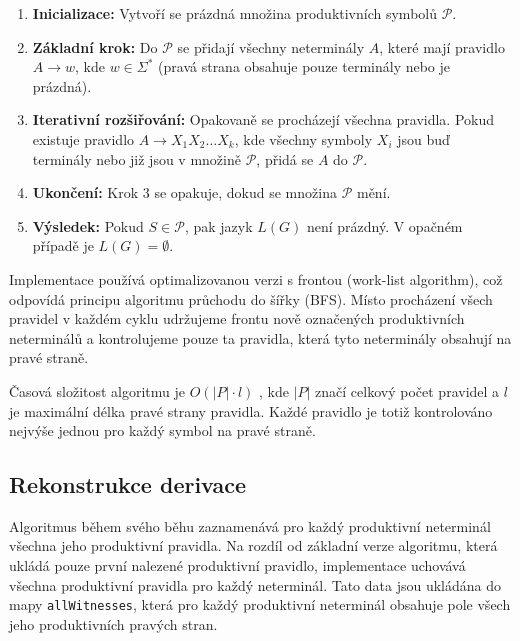 \begin{enumerate}
    \item \textbf{Inicializace:} Vytvoří se prázdná množina produktivních symbolů \( \mathcal{P} \).
    
    \item \textbf{Základní krok:} Do \( \mathcal{P} \) se přidají všechny neterminály \( A \), které mají pravidlo \( A \to w \), kde \( w \in \Sigma^* \) (pravá strana obsahuje pouze terminály nebo je prázdná).
    
    \item \textbf{Iterativní rozšiřování:} Opakovaně se procházejí všechna pravidla. Pokud existuje pravidlo \( A \to X_1 X_2 \dots X_k \), kde všechny symboly \( X_i \) jsou buď terminály nebo již jsou v množině \( \mathcal{P} \), přidá se \( A \) do \( \mathcal{P} \).
    
    \item \textbf{Ukončení:} Krok 3 se opakuje, dokud se množina \( \mathcal{P} \) mění.
    
    \item \textbf{Výsledek:} Pokud \( S \in \mathcal{P} \), pak jazyk \( L(G) \) není prázdný. V opačném případě je \( L(G) = \emptyset \).
\end{enumerate}

Implementace používá optimalizovanou verzi s frontou (work-list algorithm), což odpovídá principu algoritmu průchodu do šířky (BFS). Místo procházení všech pravidel v každém cyklu udržujeme frontu nově označených produktivních neterminálů a kontrolujeme pouze ta pravidla, která tyto neterminály obsahují na pravé straně.

Časová složitost algoritmu je \( O(|P| \cdot l) \) \cite{uti_grammars}, kde \( |P| \) značí celkový počet pravidel a \( l \) je maximální délka pravé strany pravidla. Každé pravidlo je totiž kontrolováno nejvýše jednou pro každý symbol na pravé straně.

\subsection{Rekonstrukce derivace}
\label{sec:GrammarsWitness}


Algoritmus během svého běhu zaznamenává pro každý produktivní neterminál všechna jeho produktivní pravidla. Na rozdíl od základní verze algoritmu, která ukládá pouze první nalezené produktivní pravidlo, implementace uchovává všechna produktivní pravidla pro každý neterminál. Tato data jsou ukládána do mapy \texttt{allWitnesses}, která pro každý produktivní neterminál obsahuje pole všech jeho produktivních pravých stran.


